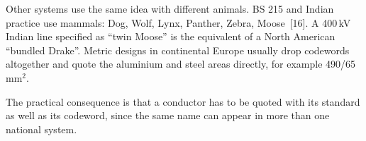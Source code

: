 Other systems use the same idea with different animals. BS 215 and Indian
practice use mammals: Dog, Wolf, Lynx, Panther, Zebra, Moose~[16]. A 400\,kV
Indian line specified as ``twin Moose'' is the equivalent of a North
American ``bundled Drake''. Metric designs in continental Europe usually
drop codewords altogether and quote the aluminium and steel areas directly,
for example 490/65\,mm$^2$.

The practical consequence is that a conductor has to be quoted with its
standard as well as its codeword, since the same name can appear in more
than one national system.

\FloatBarrier
